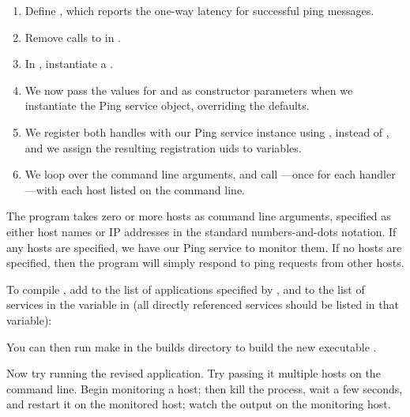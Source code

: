 \begin{enumerate}

\item Define , which reports the one-way
  latency for successful ping messages.

\item Remove calls to  in
  .

\item In , instantiate a
  .

\item We now pass the values for  and
   as constructor parameters when we
  instantiate the Ping service object, overriding the defaults.

\item We register both handles with our Ping service instance using
  , instead of
  , and we assign the resulting
  registration uids to variables.

\item We loop over the command line arguments, and call
  ---once for each handler---with each host listed
  on the command line.

\end{enumerate}


The program takes zero or more hosts as command line arguments,
specified as either host names or IP addresses in the standard
numbers-and-dots notation.  If any hosts are specified, we have our
Ping service to monitor them.  If no hosts are specified, then the
program will simply respond to ping requests from other hosts.

To compile , add  to the list of
applications specified by , and  to the
list of services in the  variable in
 (all directly referenced
services should be listed in that variable):



You can then run make in the builds directory to build the new
executable .

Now try running the revised  application.  Try passing
it multiple hosts on the command line.  Begin monitoring a host; then
kill the  process, wait a few seconds, and restart it on
the monitored host; watch the output on the monitoring host.

